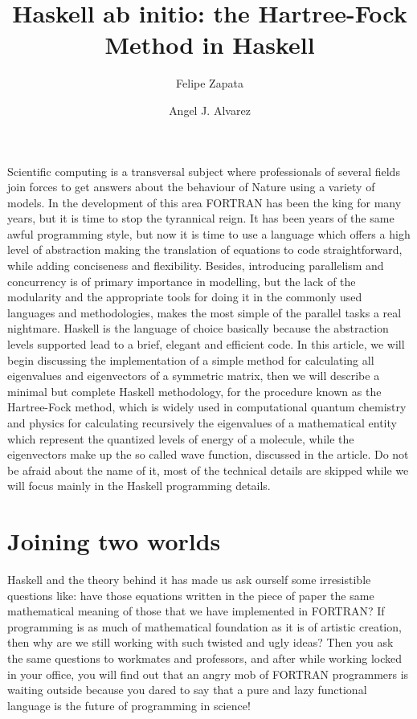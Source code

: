 \documentclass{tmr}
\title{Haskell ab initio: the Hartree-Fock Method in Haskell}
\author{Felipe Zapata\email{felipe.zapata@edu.uah.es}}
\author{Angel J. Alvarez\email{a.alvarez@uah.es}}
\begin{document}
\begin{introduction}

Scientific computing is a transversal subject where professionals of several 
fields join forces to get answers about the behaviour of Nature
using a variety of models. In the development of this area
FORTRAN has been the king for many years, but it is time to stop the 
tyrannical reign. It has been years of the same awful programming style, but now
it is time to use a language which offers a high level of abstraction 
making the translation of equations to code straightforward, while adding
conciseness and flexibility. Besides, introducing parallelism and 
concurrency is of primary importance in modelling, but the lack of the modularity 
and the appropriate tools for doing it in 
the commonly used languages and methodologies, makes the most simple of
the parallel tasks a real nightmare. Haskell is the language of choice
basically because the abstraction levels supported 
lead to a brief, elegant and efficient code. In this article, we will  
begin discussing the implementation of a simple method for calculating
all eigenvalues and eigenvectors of a symmetric matrix, then we will 
describe a minimal but complete Haskell methodology, for the procedure known as 
the Hartree-Fock method, which is widely used in computational quantum chemistry and
physics for calculating recursively the eigenvalues of a mathematical entity
which represent the quantized levels of energy of a molecule, while the eigenvectors make up
the so called wave function, discussed in the article.
 Do not be afraid about 
the name of it, most of the technical details are skipped while we will focus mainly
in the Haskell programming details.
 

\end{introduction}


\section{Joining two worlds}

Haskell and the theory behind it has made us 
ask ourself some irresistible questions like: have those equations written in the
piece of paper the same mathematical meaning of those that we 
have implemented in FORTRAN? If programming is as much of mathematical
foundation as it is of artistic creation, then why are we still working
with such twisted and ugly ideas? Then you ask the same questions to workmates
and professors, and after while working locked in your
office, you will find out that an angry mob of FORTRAN programmers is waiting outside
 because you dared to say that a pure and lazy functional language is the future of 
programming in science! 
\end{document}
